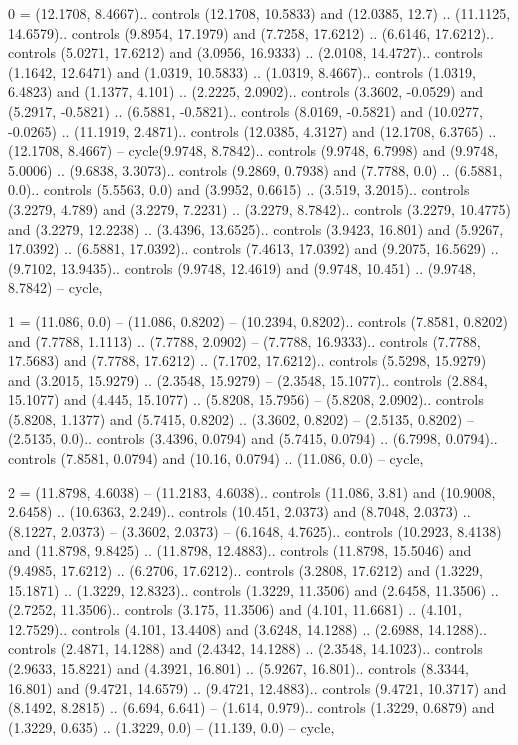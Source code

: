 0 = {(12.1708, 8.4667).. controls (12.1708, 10.5833) and (12.0385, 12.7) .. (11.1125, 14.6579).. controls (9.8954, 17.1979) and (7.7258, 17.6212) .. (6.6146, 17.6212).. controls (5.0271, 17.6212) and (3.0956, 16.9333) .. (2.0108, 14.4727).. controls (1.1642, 12.6471) and (1.0319, 10.5833) .. (1.0319, 8.4667).. controls (1.0319, 6.4823) and (1.1377, 4.101) .. (2.2225, 2.0902).. controls (3.3602, -0.0529) and (5.2917, -0.5821) .. (6.5881, -0.5821).. controls (8.0169, -0.5821) and (10.0277, -0.0265) .. (11.1919, 2.4871).. controls (12.0385, 4.3127) and (12.1708, 6.3765) .. (12.1708, 8.4667) -- cycle(9.9748, 8.7842).. controls (9.9748, 6.7998) and (9.9748, 5.0006) .. (9.6838, 3.3073).. controls (9.2869, 0.7938) and (7.7788, 0.0) .. (6.5881, 0.0).. controls (5.5563, 0.0) and (3.9952, 0.6615) .. (3.519, 3.2015).. controls (3.2279, 4.789) and (3.2279, 7.2231) .. (3.2279, 8.7842).. controls (3.2279, 10.4775) and (3.2279, 12.2238) .. (3.4396, 13.6525).. controls (3.9423, 16.801) and (5.9267, 17.0392) .. (6.5881, 17.0392).. controls (7.4613, 17.0392) and (9.2075, 16.5629) .. (9.7102, 13.9435).. controls (9.9748, 12.4619) and (9.9748, 10.451) .. (9.9748, 8.7842) -- cycle},

1 = {(11.086, 0.0) -- (11.086, 0.8202) -- (10.2394, 0.8202).. controls (7.8581, 0.8202) and (7.7788, 1.1113) .. (7.7788, 2.0902) -- (7.7788, 16.9333).. controls (7.7788, 17.5683) and (7.7788, 17.6212) .. (7.1702, 17.6212).. controls (5.5298, 15.9279) and (3.2015, 15.9279) .. (2.3548, 15.9279) -- (2.3548, 15.1077).. controls (2.884, 15.1077) and (4.445, 15.1077) .. (5.8208, 15.7956) -- (5.8208, 2.0902).. controls (5.8208, 1.1377) and (5.7415, 0.8202) .. (3.3602, 0.8202) -- (2.5135, 0.8202) -- (2.5135, 0.0).. controls (3.4396, 0.0794) and (5.7415, 0.0794) .. (6.7998, 0.0794).. controls (7.8581, 0.0794) and (10.16, 0.0794) .. (11.086, 0.0) -- cycle},

2 = {(11.8798, 4.6038) -- (11.2183, 4.6038).. controls (11.086, 3.81) and (10.9008, 2.6458) .. (10.6363, 2.249).. controls (10.451, 2.0373) and (8.7048, 2.0373) .. (8.1227, 2.0373) -- (3.3602, 2.0373) -- (6.1648, 4.7625).. controls (10.2923, 8.4138) and (11.8798, 9.8425) .. (11.8798, 12.4883).. controls (11.8798, 15.5046) and (9.4985, 17.6212) .. (6.2706, 17.6212).. controls (3.2808, 17.6212) and (1.3229, 15.1871) .. (1.3229, 12.8323).. controls (1.3229, 11.3506) and (2.6458, 11.3506) .. (2.7252, 11.3506).. controls (3.175, 11.3506) and (4.101, 11.6681) .. (4.101, 12.7529).. controls (4.101, 13.4408) and (3.6248, 14.1288) .. (2.6988, 14.1288).. controls (2.4871, 14.1288) and (2.4342, 14.1288) .. (2.3548, 14.1023).. controls (2.9633, 15.8221) and (4.3921, 16.801) .. (5.9267, 16.801).. controls (8.3344, 16.801) and (9.4721, 14.6579) .. (9.4721, 12.4883).. controls (9.4721, 10.3717) and (8.1492, 8.2815) .. (6.694, 6.641) -- (1.614, 0.979).. controls (1.3229, 0.6879) and (1.3229, 0.635) .. (1.3229, 0.0) -- (11.139, 0.0) -- cycle},

